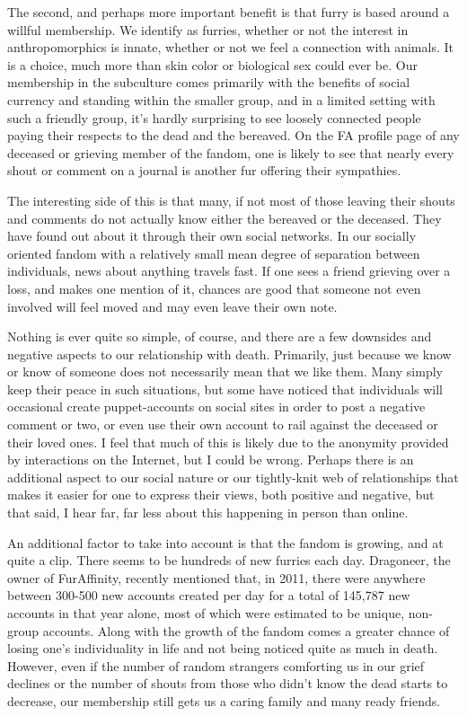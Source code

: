 The second, and perhaps more important benefit is that furry is based around a willful membership.  We identify as furries, whether or not the interest in anthropomorphics is innate, whether or not we feel a connection with animals.  It is a choice, much more than skin color or biological sex could ever be.  Our membership in the subculture comes primarily with the benefits of social currency and standing within the smaller group, and in a limited setting with such a friendly group, it's hardly surprising to see loosely connected people paying their respects to the dead and the bereaved.  On the FA profile page of any deceased or grieving member of the fandom, one is likely to see that nearly every shout or comment on a journal is another fur offering their sympathies.

The interesting side of this is that many, if not most of those leaving their shouts and comments do not actually know either the bereaved or the deceased.   They have found out about it through their own social networks.  In our socially oriented fandom with a relatively small mean degree of separation between individuals, news about anything travels fast.  If one sees a friend grieving over a loss, and makes one mention of it, chances are good that someone not even involved will feel moved and may even leave their own note.

Nothing is ever quite so simple, of course, and there are a few downsides and negative aspects to our relationship with death.  Primarily, just because we know or know of someone does not necessarily mean that we like them.  Many simply keep their peace in such situations, but some have noticed that individuals will occasional create puppet-accounts on social sites in order to post a negative comment or two, or even use their own account to rail against the deceased or their loved ones.  I feel that much of this is likely due to the anonymity provided by interactions on the Internet, but I could be wrong.  Perhaps there is an additional aspect to our social nature or our tightly-knit web of relationships that makes it easier for one to express their views, both positive and negative, but that said, I hear far, far less about this happening in person than online.

An additional factor to take into account is that the fandom is growing, and at quite a clip.  There seems to be hundreds of new furries each day.  Dragoneer, the owner of FurAffinity, recently mentioned that, in 2011, there were anywhere between 300-500 new accounts created per day for a total of 145,787 new accounts in that year alone, most of which were estimated to be unique, non-group accounts.  Along with the growth of the fandom comes a greater chance of losing one's individuality in life and not being noticed quite as much in death.  However, even if the number of random strangers comforting us in our grief declines or the number of shouts from those who didn't know the dead starts to decrease, our membership still gets us a caring family and many ready friends.

